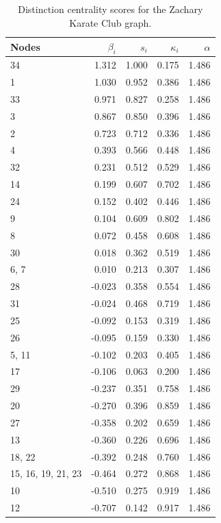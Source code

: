 \begin{table}
\centering
\caption{\label{tab:zachary}Distinction centrality scores for the Zachary Karate Club graph.}
\centering
\begin{tabular}[t]{lrrrr}
\toprule
Nodes & $\beta_i$ & $s_i$ & $\kappa_i$ & $\alpha$\\
\midrule
34 & 1.312 & 1.000 & 0.175 & 1.486\\
1 & 1.030 & 0.952 & 0.386 & 1.486\\
33 & 0.971 & 0.827 & 0.258 & 1.486\\
3 & 0.867 & 0.850 & 0.396 & 1.486\\
2 & 0.723 & 0.712 & 0.336 & 1.486\\
4 & 0.393 & 0.566 & 0.448 & 1.486\\
32 & 0.231 & 0.512 & 0.529 & 1.486\\
14 & 0.199 & 0.607 & 0.702 & 1.486\\
24 & 0.152 & 0.402 & 0.446 & 1.486\\
9 & 0.104 & 0.609 & 0.802 & 1.486\\
8 & 0.072 & 0.458 & 0.608 & 1.486\\
30 & 0.018 & 0.362 & 0.519 & 1.486\\
6, 7 & 0.010 & 0.213 & 0.307 & 1.486\\
28 & -0.023 & 0.358 & 0.554 & 1.486\\
31 & -0.024 & 0.468 & 0.719 & 1.486\\
25 & -0.092 & 0.153 & 0.319 & 1.486\\
26 & -0.095 & 0.159 & 0.330 & 1.486\\
5, 11 & -0.102 & 0.203 & 0.405 & 1.486\\
17 & -0.106 & 0.063 & 0.200 & 1.486\\
29 & -0.237 & 0.351 & 0.758 & 1.486\\
20 & -0.270 & 0.396 & 0.859 & 1.486\\
27 & -0.358 & 0.202 & 0.659 & 1.486\\
13 & -0.360 & 0.226 & 0.696 & 1.486\\
18, 22 & -0.392 & 0.248 & 0.760 & 1.486\\
15, 16, 19, 21, 23 & -0.464 & 0.272 & 0.868 & 1.486\\
10 & -0.510 & 0.275 & 0.919 & 1.486\\
12 & -0.707 & 0.142 & 0.917 & 1.486\\
\bottomrule
\end{tabular}
\end{table}
